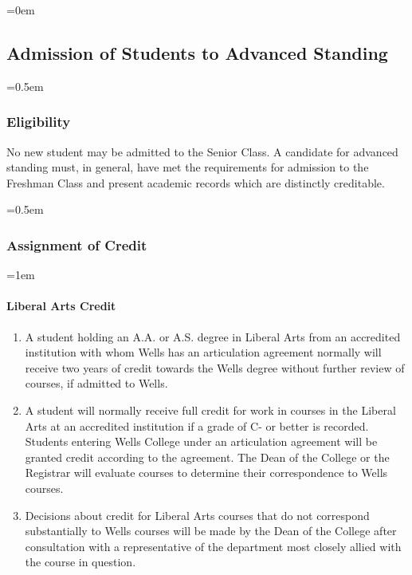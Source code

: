 \documentclass{manual}
\newcommand{\modified}[1]{}
\let\oldsubsection\subsection
\renewcommand\subsection{\leftskip=0em\oldsubsection}
\let\oldsubsubsection\subsubsection
\renewcommand\subsubsection{\leftskip=0.5em\oldsubsubsection}
\let\oldparagraph\paragraph
\renewcommand\paragraph{\leftskip=1em\oldparagraph}
\newcommand{\editRemove}[1]{}
\newcommand{\they}{(pronoun)~ }
\newcommand{\their}{(pronoun)~ }
\newcommand{\itemLevelA}{\alph*.}
\newcommand{\itemRefA}{\alph*}
\begin{document}
\subsection{Admission of Students to Advanced Standing}\label{sec:AdmissionOfStudentsToAdvancedStanding}
\subsubsection{Eligibility}

No new student may be admitted to the Senior Class. A candidate for advanced standing must, in general, have met the requirements for admission to the Freshman Class and present academic records which are distinctly creditable.

\subsubsection{Assignment of Credit}\label{sub:AssignmentOfCredit}

\paragraph{Liberal Arts Credit}

\begin{enumerate}[label=\itemLevelA,ref=\itemRefA]
\item A student holding an A.A. or A.S. degree in Liberal Arts from an accredited institution with whom Wells has an articulation agreement normally will receive two years of credit towards the Wells degree without further review of \editRemove{\their} courses, if \editRemove{\they is} admitted to Wells.

\item A student will normally receive full credit for work in courses in the Liberal Arts \modified{9/14/99} at an accredited institution if a grade of C- or better is recorded. Students entering Wells College under an articulation agreement will be granted credit according to the agreement. The Dean of  the College or the Registrar will evaluate courses to determine their correspondence to Wells courses.

\item Decisions about credit for Liberal Arts courses that do not correspond substantially to Wells courses will be made by the Dean of the College after consultation with a representative of the department most closely allied with the course in question.
\end{enumerate}
\end{document}

